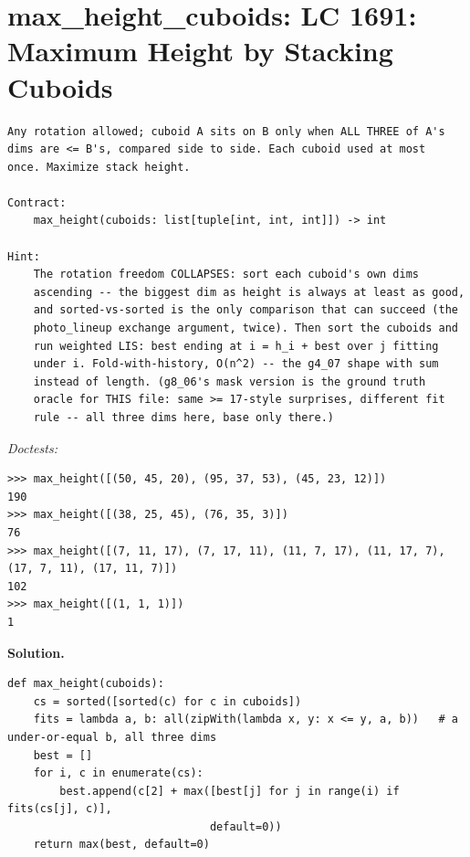 \documentclass[11pt,letterpaper]{book}
\begin{document}
\section{max\_height\_cuboids: LC 1691: Maximum Height by Stacking Cuboids}
\begin{lstlisting}[style=spec]
Any rotation allowed; cuboid A sits on B only when ALL THREE of A's
dims are <= B's, compared side to side. Each cuboid used at most
once. Maximize stack height.

Contract:
    max_height(cuboids: list[tuple[int, int, int]]) -> int

Hint:
    The rotation freedom COLLAPSES: sort each cuboid's own dims
    ascending -- the biggest dim as height is always at least as good,
    and sorted-vs-sorted is the only comparison that can succeed (the
    photo_lineup exchange argument, twice). Then sort the cuboids and
    run weighted LIS: best ending at i = h_i + best over j fitting
    under i. Fold-with-history, O(n^2) -- the g4_07 shape with sum
    instead of length. (g8_06's mask version is the ground truth
    oracle for THIS file: same >= 17-style surprises, different fit
    rule -- all three dims here, base only there.)
\end{lstlisting}
\noindent\textit{Doctests:}
\begin{lstlisting}[style=spec]
>>> max_height([(50, 45, 20), (95, 37, 53), (45, 23, 12)])
190
>>> max_height([(38, 25, 45), (76, 35, 3)])
76
>>> max_height([(7, 11, 17), (7, 17, 11), (11, 7, 17), (11, 17, 7), (17, 7, 11), (17, 11, 7)])
102
>>> max_height([(1, 1, 1)])
1
\end{lstlisting}
\noindent\textbf{Solution.}
\begin{lstlisting}[style=code]
def max_height(cuboids):
    cs = sorted([sorted(c) for c in cuboids])
    fits = lambda a, b: all(zipWith(lambda x, y: x <= y, a, b))   # a under-or-equal b, all three dims
    best = []
    for i, c in enumerate(cs):
        best.append(c[2] + max([best[j] for j in range(i) if fits(cs[j], c)],
                               default=0))
    return max(best, default=0)
\end{lstlisting}
\end{document}
